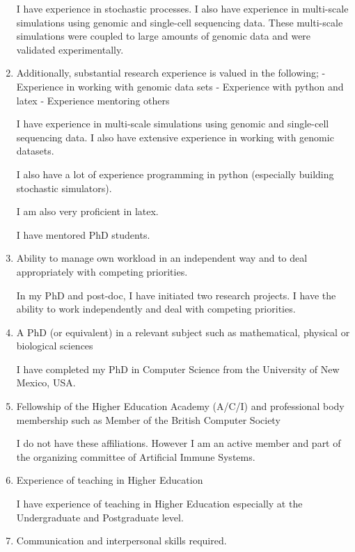 \documentclass[10pt]{article}
\begin{document}
\begin{enumerate}
I have experience in stochastic processes. I also have experience in multi-scale simulations using genomic and single-cell sequencing data.
These multi-scale simulations were coupled to large amounts of genomic data and were validated experimentally.


\item Additionally, substantial research experience is valued in the following;
- Experience in working with genomic data sets
- Experience with python and latex
- Experience mentoring others


I have experience in multi-scale simulations using genomic and single-cell sequencing data. I also have extensive experience in working with genomic datasets.

I also have a lot of experience programming in python (especially building stochastic simulators).

I am also very proficient in latex.

I have mentored PhD students.



\item Ability to manage own workload in an independent way and to deal appropriately with competing priorities.

In my PhD and post-doc, I have initiated two research projects. I have the ability to work independently and deal with competing priorities.



\item A PhD (or equivalent) in a relevant subject such as mathematical, physical or biological sciences

I have completed my PhD in Computer Science from the University of New Mexico, USA.


\item Fellowship of the Higher Education Academy (A/C/I) and professional body membership such as Member of the British Computer Society

I do not have these affiliations. However I am an active member and part of the organizing committee of Artificial Immune Systems.


\item Experience of teaching in Higher Education

I have experience of teaching in Higher Education especially at the Undergraduate and Postgraduate level.


\item Communication and interpersonal skills required.


\end{enumerate}
\end{document}
